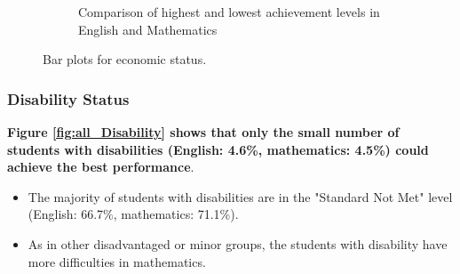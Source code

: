 \documentclass[11pt]{article}
\begin{document}
\begin{figure}[h!]
\begin{subfigure}{0.6\textwidth}
         \caption{Comparison of highest and lowest achievement levels 
in English and Mathematics}
         \label{fig:Economic_two}
\end{subfigure}
\caption{Bar plots for economic status.}
\label{fig:all_Economic}
\end{figure}

    
 \subsubsection{Disability Status}
\textbf{Figure \ref{fig:all_Disability} shows that only the small number of students with disabilities (English: 4.6\%, mathematics: 4.5\%) could achieve the best performance}.
\begin{itemize}
	\item The majority of students with disabilities are in the "Standard Not Met" level (English: 66.7\%, mathematics: 71.1\%).
\item As in other disadvantaged or minor groups, the students with disability have more difficulties in mathematics. 
\end{itemize}
\end{document}
